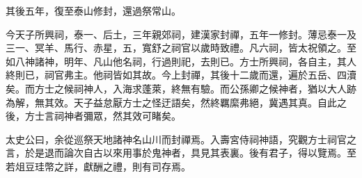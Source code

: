 其後五年，復至泰山修封，還過祭常山。

今天子所興祠，泰一、后土，三年親郊祠，建漢家封禪，五年一修封。薄忌泰一及三一、冥羊、馬行、赤星，五，寬舒之祠官以歲時致禮。凡六祠，皆太祝領之。至如八神諸神，明年、凡山他名祠，行過則祀，去則已。方士所興祠，各自主，其人終則已，祠官弗主。他祠皆如其故。今上封禪，其後十二歲而還，遍於五岳、四瀆矣。而方士之候祠神人，入海求蓬萊，終無有驗。而公孫卿之候神者，猶以大人跡為解，無其效。天子益怠厭方士之怪迂語矣，然終羈縻弗絕，冀遇其真。自此之後，方士言祠神者彌眾，然其效可睹矣。

太史公曰，余從巡祭天地諸神名山川而封禪焉。入壽宮侍祠神語，究觀方士祠官之言，於是退而論次自古以來用事於鬼神者，具見其表裏。後有君子，得以覽焉。至若俎豆珪幣之詳，獻酬之禮，則有司存焉。